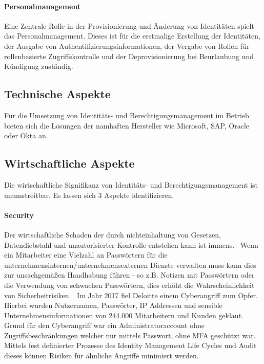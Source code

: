 \documentclass[11pt]{article}
\begin{document}
\paragraph{Personalmanagement}
Eine Zentrale Rolle in der Provisionierung und Änderung von Identitäten spielt das Personalmanagement. Dieses ist für die erstmalige Erstellung der Identitäten, der Ausgabe von Authentifizierungsinformationen, der Vergabe von Rollen für rollenbasierte Zugriffskontrolle und der Deprovisionierung bei Beurlaubung und Kündigung zuständig.~\cite{YOUNG20045}
\subsection{Technische Aspekte}
Für die Umsetzung von Identitäts- und Berechtigungsmanagement im Betrieb bieten sich die Lösungen der namhaften Hersteller wie Microsoft, SAP, Oracle oder Okta an.
\subsection{Wirtschaftliche Aspekte}
Die wirtschaftliche Signifikanz von Identitäts- und Berechtigungsmanagement ist unumstreitbar. Es lassen sich 3 Aspekte identifizieren.
\paragraph{Security}
Der wirtschaftliche Schaden der durch nichteinhaltung von Gesetzen, Datendiebstahl und unautorisierter Kontrolle entstehen kann ist immens.~\cite{azhar2014economics} Wenn ein Mitarbeiter eine Vielzahl an Passwörtern für die unternehmensinternen/unternehmensexternen Dienste verwalten muss kann dies zur unsachgemäßen Handhabung führen - so z.B. Notizen mit Passwörtern oder die Verwendung von schwachen Passwörtern, dies erhöht die Wahrscheinlichkeit von Sicherheitrisiken.~\cite{haag2012selecting} Im Jahr 2017 fiel Deloitte einem Cyberangriff zum Opfer. Hierbei wurden Nutzernamen, Passwörter, IP Addressen und sensible Unternehmensinformationen von 244.000 Mitarbeitern und Kunden geklaut. Grund für den Cyberangriff war ein Administratoraccount ohne Zugriffsbeschränkungen welcher nur mittels Passwort, ohne MFA geschützt war.~\cite{deloitte2017} Mittels fest definierter Prozesse des Identity Management Life Cycles und Audit dieses können Risiken für ähnliche Angriffe minimiert werden.
\end{document}
